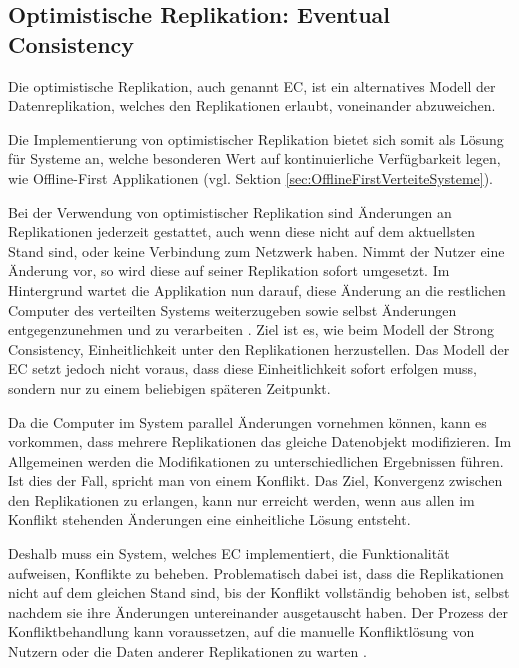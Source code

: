 \documentclass[a4paper, 12pt]{scrreprt}
\begin{document}
\subsection{Optimistische Replikation: Eventual Consistency}

Die optimistische Replikation, auch genannt \acf{EC}, ist ein alternatives Modell der Datenreplikation, welches den Replikationen erlaubt, voneinander abzuweichen.

Die Implementierung von optimistischer Replikation bietet sich somit als Lösung für Systeme an, welche besonderen Wert auf kontinuierliche Verfügbarkeit legen, wie Offline-First Applikationen (vgl. Sektion \ref{sec:OfflineFirstVerteiteSysteme}). 

Bei der Verwendung von optimistischer Replikation sind Änderungen an Replikationen jederzeit gestattet, auch wenn diese nicht auf dem aktuellsten Stand sind, oder keine Verbindung zum Netzwerk haben. Nimmt der Nutzer eine Änderung vor, so wird diese auf seiner Replikation sofort umgesetzt. Im Hintergrund wartet die Applikation nun darauf, diese Änderung an die restlichen Computer des verteilten Systems weiterzugeben sowie selbst Änderungen entgegenzunehmen und zu verarbeiten \autocite[S.46]{ArticleOptimisticReplication}. Ziel ist es, wie beim Modell der Strong Consistency, Einheitlichkeit unter den Replikationen herzustellen. Das Modell der \ac{EC} setzt jedoch nicht voraus, dass diese Einheitlichkeit sofort erfolgen muss, sondern nur zu einem beliebigen späteren Zeitpunkt. 

Da die Computer im System parallel Änderungen vornehmen können, kann es vorkommen, dass mehrere Replikationen das gleiche Datenobjekt modifizieren. Im Allgemeinen werden die Modifikationen zu unterschiedlichen Ergebnissen führen. Ist dies der Fall, spricht man von einem Konflikt. Das Ziel, Konvergenz zwischen den Replikationen zu erlangen, kann nur erreicht werden, wenn aus allen im Konflikt stehenden Änderungen eine einheitliche Lösung entsteht.

Deshalb muss ein System, welches \ac{EC} implementiert, die Funktionalität aufweisen, Konflikte zu beheben. Problematisch dabei ist, dass die Replikationen nicht auf dem gleichen Stand sind, bis der Konflikt vollständig behoben ist, selbst nachdem sie ihre Änderungen untereinander ausgetauscht haben. Der Prozess der Konfliktbehandlung kann voraussetzen, auf die manuelle Konfliktlösung von Nutzern oder die Daten anderer Replikationen zu warten \autocite{ArticleEventualConsistencyConflicts}.
\end{document}
